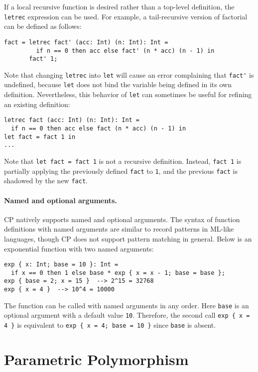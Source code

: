If a local recursive function is desired rather than a top-level definition, the
\lstinline{letrec} expression can be used. For example, a tail-recursive
version of factorial can be defined as follows:
\begin{lstlisting}
fact = letrec fact' (acc: Int) (n: Int): Int =
         if n == 0 then acc else fact' (n * acc) (n - 1) in
       fact' 1;
\end{lstlisting}
Note that changing \lstinline{letrec} into \lstinline{let} will cause an error
complaining that \lstinline{fact'} is undefined, because \lstinline{let} does
not bind the variable being defined in its own definition. Nevertheless, this
behavior of \lstinline{let} can sometimes be useful for refining an existing
definition:
\begin{lstlisting}
letrec fact (acc: Int) (n: Int): Int =
  if n == 0 then acc else fact (n * acc) (n - 1) in
let fact = fact 1 in
...
\end{lstlisting}
Note that \lstinline{let fact = fact 1} is not a recursive definition. Instead,
\lstinline{fact 1} is partially applying the previously defined \lstinline{fact}
to \lstinline{1}, and the previous \lstinline{fact} is shadowed by the new
\lstinline{fact}.

\paragraph{Named and optional arguments.}
CP natively supports named and optional arguments. The syntax of function
definitions with named arguments are similar to record patterns in ML-like
languages, though CP does not support pattern matching in general. Below is an
exponential function with two named arguments:
\begin{lstlisting}
exp { x: Int; base = 10 }: Int =
  if x == 0 then 1 else base * exp { x = x - 1; base = base };
exp { base = 2; x = 15 }  --> 2^15 = 32768
exp { x = 4 }  --> 10^4 = 10000
\end{lstlisting}
The function can be called with named arguments in any order. Here
\lstinline{base} is an optional argument with a default value \lstinline{10}.
Therefore, the second call \lstinline|exp { x = 4 }| is equivalent to
\lstinline|exp { x = 4; base = 10 }| since \lstinline{base} is absent.

\section{Parametric Polymorphism}

